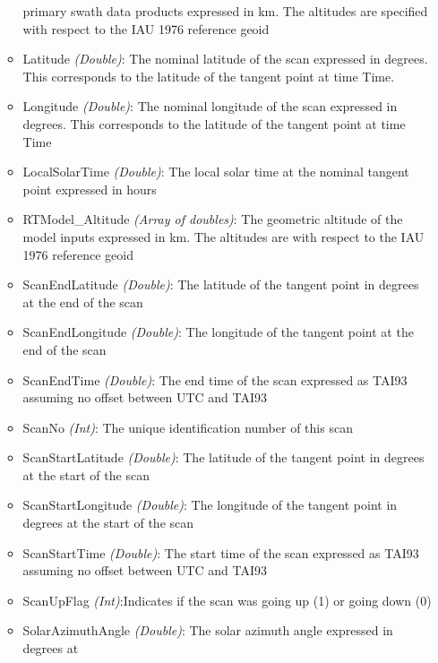 \begin{itemize}
\begin{itemize}
                primary swath data products expressed in km. The altitudes are specified with 
                respect to the IAU 1976 reference geoid
            \item Latitude              \emph{(Double)}: The nominal latitude of the scan expressed 
                in degrees. This corresponds to the latitude of the tangent point at time Time.
            \item Longitude             \emph{(Double)}: The nominal longitude of the scan expressed 
                in degrees. This corresponds to the latitude of the tangent point at time Time
            \item LocalSolarTime        \emph{(Double)}: The local solar time at the nominal tangent 
                point expressed in hours
            \item RTModel\_Altitude      \emph{(Array of doubles)}: The geometric altitude of the model 
                inputs expressed in km. The altitudes are with respect to the IAU 1976 reference geoid 
            \item ScanEndLatitude       \emph{(Double)}: The latitude of the tangent point in degrees 
                at the end of the scan
            \item ScanEndLongitude      \emph{(Double)}: The longitude of the tangent point at the end 
                of the scan
            \item ScanEndTime           \emph{(Double)}: The end time of the scan expressed as TAI93 
                assuming no offset between UTC and TAI93
            \item ScanNo                \emph{(Int)}: The unique identification number of this scan
            \item ScanStartLatitude     \emph{(Double)}: The latitude of the tangent point in degrees 
                at the start of the scan
            \item ScanStartLongitude    \emph{(Double)}: The longitude of the tangent point in degrees 
                at the start of the scan
            \item ScanStartTime         \emph{(Double)}: The start time of the scan expressed as TAI93 
                assuming no offset between UTC and TAI93
            \item ScanUpFlag            \emph{(Int)}:Indicates if the scan was going up (1) or going down (0)
            \item SolarAzimuthAngle     \emph{(Double)}:  The solar azimuth angle expressed in degrees at 

\end{itemize}
\end{itemize}

